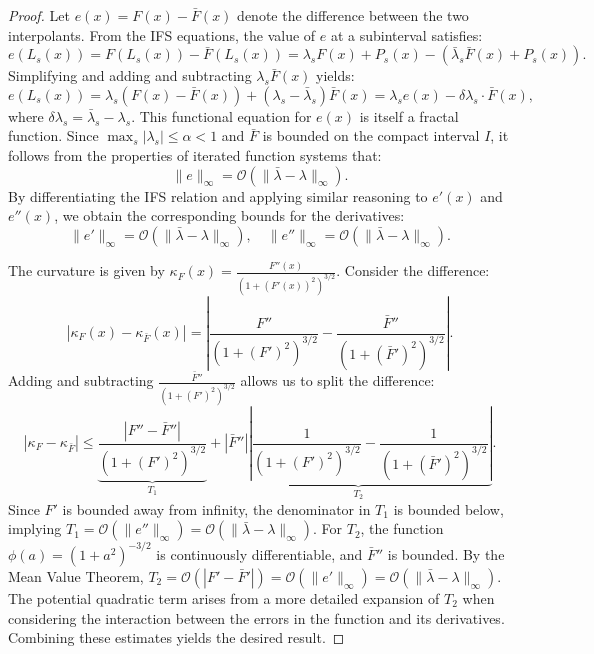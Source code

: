 \documentclass[runningheads]{llncs}
\begin{document}
	\begin{proof}
		Let \( e(x) = F(x) - \bar{F}(x) \) denote the difference between the two interpolants. From the IFS equations, the value of \( e \) at a subinterval satisfies:
		\[
		e(L_s(x)) = F(L_s(x)) - \bar{F}(L_s(x)) = \lambda_s F(x) + P_s(x) - \left( \bar{\lambda}_s \bar{F}(x) + P_s(x) \right).
		\]
		Simplifying and adding and subtracting \( \lambda_s \bar{F}(x) \) yields:
		\[
		e(L_s(x)) = \lambda_s (F(x) - \bar{F}(x)) + (\lambda_s - \bar{\lambda}_s) \bar{F}(x) = \lambda_s e(x) - \delta\lambda_s \cdot \bar{F}(x),
		\]
		where \( \delta\lambda_s = \bar{\lambda}_s - \lambda_s \). This functional equation for \( e(x) \) is itself a fractal function. Since \( \max_s |\lambda_s| \leq \alpha < 1 \) and \( \bar{F} \) is bounded on the compact interval \( I \), it follows from the properties of iterated function systems that:
		\[
		\|e\|_\infty = \mathcal{O}(\|\bar{\lambda} - \lambda\|_\infty).
		\]
		By differentiating the IFS relation and applying similar reasoning to \( e'(x) \) and \( e''(x) \), we obtain the corresponding bounds for the derivatives:
		\[
		\|e'\|_\infty = \mathcal{O}(\|\bar{\lambda} - \lambda\|_\infty), \quad \|e''\|_\infty = \mathcal{O}(\|\bar{\lambda} - \lambda\|_\infty).
		\]
		
		The curvature is given by \( \kappa_F(x) = \frac{F''(x)}{(1 + (F'(x))^2)^{3/2}} \). Consider the difference:
		\[
		|\kappa_F(x) - \kappa_{\bar{F}}(x)| = \left| \frac{F''}{(1 + (F')^2)^{3/2}} - \frac{\bar{F}''}{(1 + (\bar{F}')^2)^{3/2}} \right|.
		\]
		Adding and subtracting \( \frac{\bar{F}''}{(1 + (F')^2)^{3/2}} \) allows us to split the difference:
		\[
		|\kappa_F - \kappa_{\bar{F}}| \leq \underbrace{\frac{|F'' - \bar{F}''|}{(1 + (F')^2)^{3/2}}}_{T_1} + \underbrace{|\bar{F}''| \left| \frac{1}{(1 + (F')^2)^{3/2}} - \frac{1}{(1 + (\bar{F}')^2)^{3/2}} \right|}_{T_2}.
		\]
		Since \( F' \) is bounded away from infinity, the denominator in \( T_1 \) is bounded below, implying \( T_1 = \mathcal{O}(\|e''\|_\infty) = \mathcal{O}(\|\bar{\lambda} - \lambda\|_\infty) \). For \( T_2 \), the function \( \phi(a) = (1+a^2)^{-3/2} \) is continuously differentiable, and \( \bar{F}'' \) is bounded. By the Mean Value Theorem, \( T_2 = \mathcal{O}(|F' - \bar{F}'|) = \mathcal{O}(\|e'\|_\infty) = \mathcal{O}(\|\bar{\lambda} - \lambda\|_\infty) \). The potential quadratic term arises from a more detailed expansion of \( T_2 \) when considering the interaction between the errors in the function and its derivatives. Combining these estimates yields the desired result.
	\end{proof}
	
\end{document}
